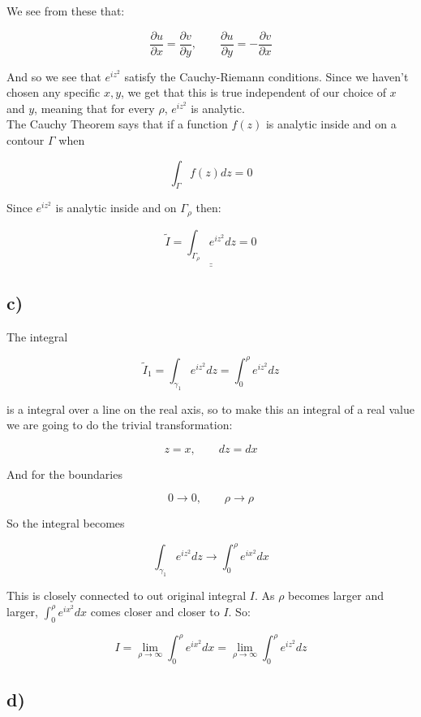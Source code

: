 \documentclass[a4paper,norsk, 10pt]{article}
\begin{document}
We see from these that:

$$
\frac{\partial u}{\partial x} = \frac{\partial v}{\partial y}, \qquad \frac{\partial u}{\partial y} = -\frac{\partial v}{\partial x}
$$

And so we see that $e^{iz^2}$ satisfy the Cauchy-Riemann conditions. Since we haven't chosen any specific $x,y$, we get that this is true independent of our choice of $x$ and $y$, meaning that for every $\rho$, $e^{iz^2}$ is analytic.\\

 The Cauchy Theorem says that if a function $f(z)$ is analytic inside and on a contour $\Gamma$ when

$$
\int_{\Gamma} f(z) dz = 0
$$

Since $e^{iz^2}$ is analytic inside and on $\Gamma_{\rho}$ then:

$$
\underline{\underline{\tilde{I} = \int_{\Gamma_{\rho}} e^{iz^2}dz = 0}}
$$

\subsection*{c)}

The integral

$$
\tilde{I}_1 = \int_{\gamma_1} e^{iz^2} dz = \int_0^{\rho} e^{iz^2} dz
$$

is a integral over a line on the real axis, so to make this an integral of a real value we are going to do the trivial transformation:

$$
z = x, \qquad dz = dx
$$

And for the boundaries

$$
0 \rightarrow 0, \qquad \rho \rightarrow \rho
$$

So the integral becomes

$$
\int_{\gamma_1} e^{iz^2} dz \rightarrow \int_0^{\rho} e^{ix^2}dx
$$

This is closely connected to out original integral $I$. As $\rho$ becomes larger and larger, $\int_0^{\rho} e^{ix^2}dx$ comes closer and closer to $I$. So:

\begin{equation}
I = \lim_{\rho \rightarrow \infty} \int_0^{\rho} e^{ix^2}dx = \lim_{\rho \rightarrow \infty} \int_0^{\rho} e^{iz^2}dz
\label{eq:I1}
\end{equation}


\subsection*{d)}
\end{document}
